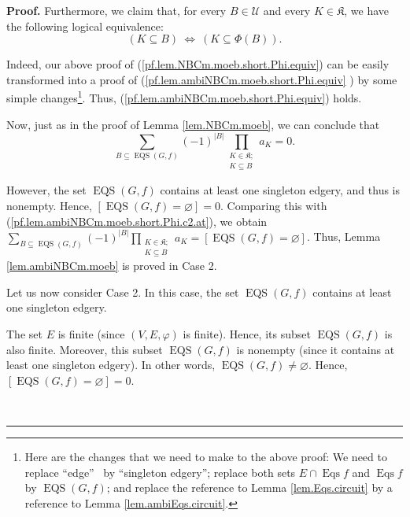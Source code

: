 \documentclass[numbers=enddot,12pt,final,onecolumn,notitlepage]{scrartcl}%
\theoremstyle{definition}
\newenvironment{proof}[1][Proof]{\noindent\textbf{#1.} }{\ \rule{0.5em}{0.5em}}
\newenvironment{verlong}{}{}
\newenvironment{vershort}{}{}
\let\sumnonlimits\sum
\let\prodnonlimits\prod
\renewcommand{\sum}{\sumnonlimits\limits}
\renewcommand{\prod}{\prodnonlimits\limits}
\begin{document}
\begin{proof}
\begin{vershort}
Furthermore, we claim that, for every $B\in\mathcal{U}$ and every
$K\in\mathfrak{K}$, we have the following logical equivalence:%
\begin{equation}
\left(  K\subseteq B\right)  \ \Longleftrightarrow\ \left(  K\subseteq
\Phi\left(  B\right)  \right)  . \label{pf.lem.ambiNBCm.moeb.short.Phi.equiv}%
\end{equation}


Indeed, our above proof of (\ref{pf.lem.NBCm.moeb.short.Phi.equiv}) can be
easily transformed into a proof of (\ref{pf.lem.ambiNBCm.moeb.short.Phi.equiv}%
) by some simple changes\footnote{Here are the changes that we need to make to
the above proof: We need to replace \textquotedblleft edge\textquotedblright%
\ by \textquotedblleft singleton edgery\textquotedblright; replace both sets
$E\cap\operatorname*{Eqs}f$ and $\operatorname*{Eqs}f$ by $\operatorname*{EQS}%
\left(  G,f\right)  $; and replace the reference to Lemma
\ref{lem.Eqs.circuit} by a reference to Lemma \ref{lem.ambiEqs.circuit}.}.
Thus, (\ref{pf.lem.ambiNBCm.moeb.short.Phi.equiv}) holds.

Now, just as in the proof of Lemma \ref{lem.NBCm.moeb}, we can conclude that
\begin{equation}
\sum_{B\subseteq\operatorname*{EQS}\left(  G,f\right)  }\left(  -1\right)
^{\left\vert B\right\vert }\prod_{\substack{K\in\mathfrak{K};\\K\subseteq
B}}a_{K}=0. \label{pf.lem.ambiNBCm.moeb.short.Phi.c2.at}%
\end{equation}


However, the set $\operatorname*{EQS}\left(  G,f\right)  $ contains at least
one singleton edgery, and thus is nonempty. Hence, $\left[
\operatorname*{EQS}\left(  G,f\right)  =\varnothing\right]  =0$. Comparing
this with (\ref{pf.lem.ambiNBCm.moeb.short.Phi.c2.at}), we obtain
$\sum_{B\subseteq\operatorname*{EQS}\left(  G,f\right)  }\left(  -1\right)
^{\left\vert B\right\vert }\prod_{\substack{K\in\mathfrak{K};\\K\subseteq
B}}a_{K}=\left[  \operatorname*{EQS}\left(  G,f\right)  =\varnothing\right]
$. Thus, Lemma \ref{lem.ambiNBCm.moeb} is proved in Case 2.
\end{vershort}

\begin{verlong}
Let us now consider Case 2. In this case, the set $\operatorname*{EQS}\left(
G,f\right)  $ contains at least one singleton edgery.

The set $E$ is finite (since $\left(  V,E,\varphi\right)  $ is finite). Hence,
its subset $\operatorname*{EQS}\left(  G,f\right)  $ is also finite. Moreover,
this subset $\operatorname*{EQS}\left(  G,f\right)  $ is nonempty (since it
contains at least one singleton edgery). In other words, $\operatorname*{EQS}%
\left(  G,f\right)  \neq\varnothing$. Hence, $\left[  \operatorname*{EQS}%
\left(  G,f\right)  =\varnothing\right]  =0$.


\end{verlong}
\end{proof}
\end{document}
